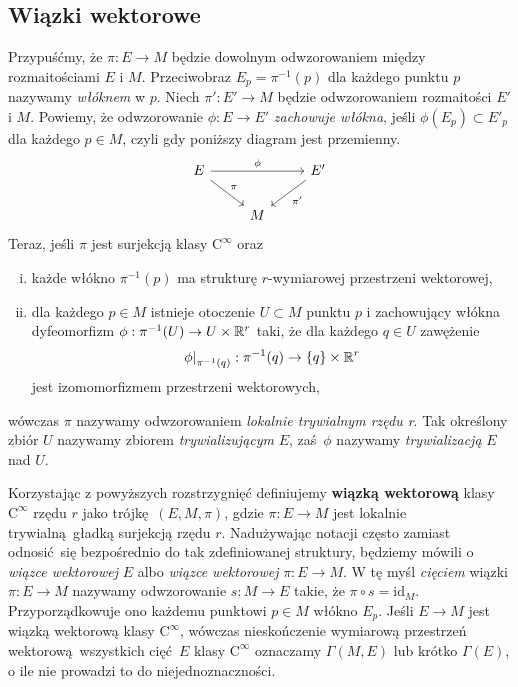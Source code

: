 \subsection{Wiązki wektorowe}
Przypuśćmy, że \(\pi: E\to M\) będzie dowolnym odwzorowaniem między rozmaitościami \(E\) i \(M\). Przeciwobraz \(E_p = \pi^{-1}(p)\) dla każdego punktu \(p\) nazywamy \emph{włóknem} w \(p\). Niech \(\pi': E'\to M\) będzie odwzorowaniem rozmaitości \(E'\) i \(M\). Powiemy, że odwzorowanie \(\phi:E\to E'\) \emph{zachowuje włókna}, jeśli \(\phi(E_p)\subset E'_p\) dla każdego \(p\in M\), czyli gdy poniższy diagram jest przemienny.
\begin{equation*}
    \begin{tikzcd}
        E \arrow{dr}{\pi} \arrow{rr}{\phi} && E' \arrow{dl}{\pi'}\\
         & M
    \end{tikzcd}
\end{equation*}
Teraz, jeśli \(\pi\) jest surjekcją klasy \(\mathrm{C}^\infty\) oraz
\begin{enumerate}[i)]
    \item każde włókno \(\pi^{-1}(p)\) ma strukturę \(r\)-wymiarowej przestrzeni wektorowej,
    \item dla każdego \(p\in M\) istnieje otoczenie \(U\subset M\) punktu \(p\) i zachowujący włókna dyfeomorfizm \(\phi: \pi^{-1}(U)\to U\times \mathbb{R}^r\) taki, że dla każdego \(q\in U\) zawężenie
\begin{equation*}
\left.\phi\right|_{\pi^{-1}(q)}:\pi^{-1}(q)\to \{q\} \times \mathbb{R}^r
\end{equation*}
jest izomomorfizmem przestrzeni wektorowych,

\end{enumerate}
wówczas \(\pi\) nazywamy odwzorowaniem \emph{lokalnie trywialnym rzędu r}.  Tak określony zbiór \(U\) nazywamy zbiorem \emph{trywializującym} \(E\), zaś \(\phi\) nazywamy \emph{trywializacją} \(E\) nad \(U\).

Korzystając z powyższych rozstrzygnięć definiujemy \textbf{wiązką wektorową} klasy \(\mathrm{C}^\infty\) rzędu \(r\) jako trójkę \((E, M, \pi)\), gdzie \(\pi: E\to M\) jest lokalnie trywialną gładką surjekcją rzędu \(r\). Nadużywając notacji często zamiast odnosić się bezpośrednio do tak zdefiniowanej struktury, będziemy mówili o \emph{wiązce wektorowej} \(E\) albo \emph{wiązce wektorowej} \(\pi:E\to M\). W tę myśl \emph{cięciem} wiązki \(\pi: E\to M\) nazywamy odwzorowanie \(s:M\to E\) takie, że \(\pi\circ s= \mathrm{id}_M\). Przyporządkowuje ono każdemu punktowi \(p\in M\) włókno \(E_p\). Jeśli \(E\to M\) jest wiązką wektorową klasy \(\mathrm{C}^\infty\), wówczas nieskończenie wymiarową przestrzeń wektorową wszystkich cięć \(E\) klasy \(\mathrm{C}^\infty\) oznaczamy \(\Gamma(M, E)\) lub krótko \(\Gamma(E)\), o ile nie prowadzi to do niejednoznaczności.

